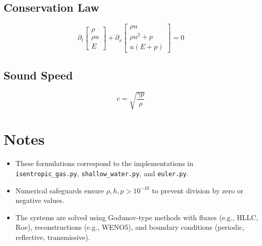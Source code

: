 \documentclass[12pt]{article}
\begin{document}
\subsection{Conservation Law}
\[
\partial_t \begin{bmatrix} \rho \\ \rho u \\ E \end{bmatrix} + \partial_x \begin{bmatrix} \rho u \\ \rho u^2 + p \\ u (E + p) \end{bmatrix} = 0
\]

\subsection{Sound Speed}
\[
c = \sqrt{\frac{\gamma p}{\rho}}
\]

\section*{Notes}
\begin{itemize}
    \item These formulations correspond to the implementations in \texttt{isentropic\_gas.py}, \texttt{shallow\_water.py}, and \texttt{euler.py}.
    \item Numerical safeguards ensure $\rho, h, p > 10^{-10}$ to prevent division by zero or negative values.
    \item The systems are solved using Godunov-type methods with fluxes (e.g., HLLC, Roe), reconstructions (e.g., WENO5), and boundary conditions (periodic, reflective, transmissive).
\end{itemize}
\end{document}
